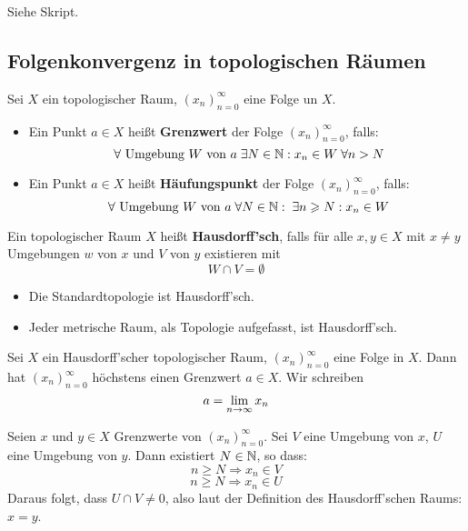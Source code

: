 \documentclass[main.tex]{subfiles}
\begin{document}
\begin{Beweis}
  Siehe Skript.
\end{Beweis}

\subsection{Folgenkonvergenz in topologischen Räumen}

\begin{Definition}
  Sei $X$ ein topologischer Raum, $(x_n)_{n=0}^\infty$ eine Folge un $X$.
  \begin{itemize}
    \item Ein Punkt $a \in X$ heißt \textbf{Grenzwert} der Folge $(x_n)_{n=0}^\infty$, falls:
      $$\;\forall \text{ Umgebung } W \text{ von } a \;\exists N \in \mathbb{N} : x_n \in W \;\forall n > N$$
    \item Ein Punkt $a \in X$ heißt \textbf{Häufungspunkt} der Folge $(x_n)_{n=0}^\infty$, falls:
      $$\;\forall \text{ Umgebung } W \text{ von } a \;\forall N \in \mathbb{N} : \;\exists n \geqslant N : x_n \in W$$
  \end{itemize}
\end{Definition}

\begin{Definition}
  Ein topologischer Raum $X$ heißt \textbf{Hausdorff'sch}, falls für alle $x,y \in X$ mit $x \neq y$ Umgebungen $w$ von $x$ und $V$ von $y$ existieren mit
  $$W \cap V = \emptyset$$
\end{Definition}

\begin{Beispiel}
  \begin{itemize}
    \item Die Standardtopologie ist Hausdorff'sch.
    \item Jeder metrische Raum, als Topologie aufgefasst, ist Hausdorff'sch.
  \end{itemize}
\end{Beispiel}

\begin{Theorem}
  Sei $X$ ein Hausdorff'scher topologischer Raum, $(x_n)_{n=0}^\infty$ eine Folge in $X$. Dann hat $(x_n)_{n=0}^\infty$ höchstens einen Grenzwert $a \in X$. Wir schreiben
  $$a = \lim \limits_{n \to \infty} x_n$$
\end{Theorem}

\begin{Beweis}
  Seien $x$ und $y \in X$ Grenzwerte von $(x_n)_{n=0}^\infty$. Sei $V$ eine Umgebung von $x$, $U$ eine Umgebung von $y$. Dann existiert $N \in \mathbb{N}$, so dass:
  $$n \geq N \Rightarrow x_n \in V$$
  $$n \geq N \Rightarrow x_n \in U$$
  Daraus folgt, dass $U \cap V \neq 0$, also laut der Definition des Hausdorff'schen Raums: $x = y$.
\end{Beweis}
\end{document}
